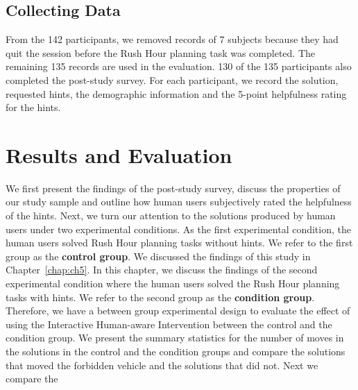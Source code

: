 \subsection{Collecting Data}
From the 142 participants, we removed records of 7 subjects because they had quit the session before the Rush Hour planning task was completed. 
The remaining 135 records are used in the evaluation.
130 of the 135 participants also completed the post-study survey.
For each participant, we record the solution, requested hints, the demographic information and the 5-point helpfulness rating for the hints.

\section{Results and Evaluation}
We first present the findings of the post-study survey, discuss the properties of our study sample and outline how human users subjectively rated the helpfulness of the hints.
Next, we turn our attention to the solutions produced by human users under two experimental conditions.
As the first experimental condition, the human users solved Rush Hour planning tasks without hints.
We refer to the first group as the \textbf{control group}.
We discussed the findings of this study in Chapter~\ref{chap:ch5}.
In this chapter, we discuss the findings of the second experimental condition where the human users solved the Rush Hour planning tasks with hints.
We refer to the second group as the \textbf{condition group}.
Therefore, we have a between group experimental design to evaluate the effect of using the Interactive Human-aware Intervention between the control and the condition group.
We present the summary statistics for the number of moves in the solutions in the control and the condition groups and compare the solutions that moved the forbidden vehicle and the solutions that did not.
Next we compare the


